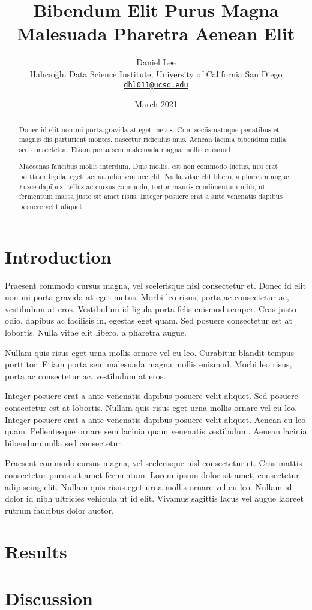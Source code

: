 \documentclass[11pt,hidelinks]{article}
\begin{document}
\title{Bibendum Elit Purus Magna Malesuada Pharetra Aenean Elit}
\author{Daniel Lee\\\footnotesize Halıcıoğlu Data Science Institute, University of California San Diego\\\texttt{\footnotesize \href{mailto:dhl011@ucsd.edu}{dhl011@ucsd.edu}}}
\date{March 2021}
\maketitle

\begin{abstract}
Donec id elit non mi porta gravida at eget metus. Cum sociis natoque penatibus et magnis dis parturient montes, nascetur ridiculus mus. Aenean lacinia bibendum nulla sed consectetur. Etiam porta sem malesuada magna mollis euismod~\cite{pearl:88}.

Maecenas faucibus mollis interdum. Duis mollis, est non commodo luctus, nisi erat porttitor ligula, eget lacinia odio sem nec elit. Nulla vitae elit libero, a pharetra augue. Fusce dapibus, tellus ac cursus commodo, tortor mauris condimentum nibh, ut fermentum massa justo sit amet risus. Integer posuere erat a ante venenatis dapibus posuere velit aliquet.
\end{abstract}

\section{Introduction}
Praesent commodo cursus magna, vel scelerisque nisl consectetur et. Donec id elit non mi porta gravida at eget metus. Morbi leo risus, porta ac consectetur ac, vestibulum at eros. Vestibulum id ligula porta felis euismod semper. Cras justo odio, dapibus ac facilisis in, egestas eget quam. Sed posuere consectetur est at lobortis. Nulla vitae elit libero, a pharetra augue.

Nullam quis risus eget urna mollis ornare vel eu leo. Curabitur blandit tempus porttitor. Etiam porta sem malesuada magna mollis euismod. Morbi leo risus, porta ac consectetur ac, vestibulum at eros.

Integer posuere erat a ante venenatis dapibus posuere velit aliquet. Sed posuere consectetur est at lobortis. Nullam quis risus eget urna mollis ornare vel eu leo. Integer posuere erat a ante venenatis dapibus posuere velit aliquet. Aenean eu leo quam. Pellentesque ornare sem lacinia quam venenatis vestibulum. Aenean lacinia bibendum nulla sed consectetur.

Praesent commodo cursus magna, vel scelerisque nisl consectetur et. Cras mattis consectetur purus sit amet fermentum. Lorem ipsum dolor sit amet, consectetur adipiscing elit. Nullam quis risus eget urna mollis ornare vel eu leo. Nullam id dolor id nibh ultricies vehicula ut id elit. Vivamus sagittis lacus vel augue laoreet rutrum faucibus dolor auctor.

\section{Results}

\section{Discussion}



\end{document}
